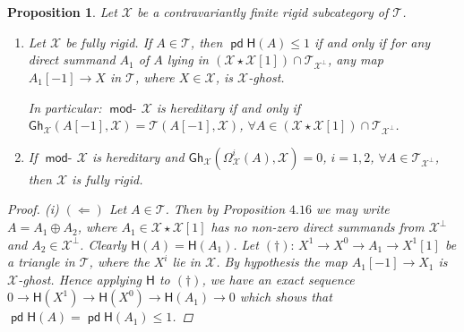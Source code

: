 \documentclass[oneside, a4paper,reqno]{amsart}
\numberwithin{equation}{section}
\newtheorem{prop}[thm]{Proposition}
\theoremstyle{definition}
\begin{document}
\begin{prop} Let ${\mathcal X}$ be a contravariantly finite rigid subcategory of ${\mathcal T}$. 
\begin{enumerate}
\item Let ${\mathcal X}$ be fully rigid.  If $A \in {\mathcal T}$, then $\operatorname{\mathsf{pd}} \mathsf{H}(A) \leq 1$ if and only if for any direct summand $A_{1}$ of $A$ lying in $({\mathcal X}\star{\mathcal X}[1]) \cap {\mathcal T}_{{\mathcal X}^{\bot}}$, any map $A_{1}[-1] {\longrightarrow} X$ in ${\mathcal T}$, where $X \in {\mathcal X}$, is ${\mathcal X}$-ghost. 

In particular:  $\operatorname*{\mathsf{mod}-\!}{\mathcal X}$ is hereditary if and only if $\mathsf{Gh}_{\mathcal X}(A[-1],{\mathcal X}) = {\mathcal T}(A[-1],{\mathcal X})$, $\forall A \in ({\mathcal X}\star{\mathcal X}[1]) \cap {\mathcal T}_{{\mathcal X}^{\bot}}$. 
\item If $\operatorname*{\mathsf{mod}-\!}{\mathcal X}$ is hereditary  and $\mathsf{Gh}_{\mathcal X}(\Omega^{i}_{\mathcal X}(A),{\mathcal X}) = 0$, $i = 1,2$,  $ \forall A \in {\mathcal T}_{{\mathcal X}^{\bot}}$, then ${\mathcal X}$ is fully rigid. 
\end{enumerate} 
\begin{proof} (i) $(\Longleftarrow)$ Let $A\in {\mathcal T}$. Then by Proposition $4.16$ we may write $A = A_{1} \oplus A_{2}$, where $A_{1} \in {\mathcal X}\star{\mathcal X}[1]$ has no non-zero direct summands from ${\mathcal X}^{\bot}$ and $A_{2} \in {\mathcal X}^{\bot}$. Clearly $\mathsf{H}(A) = \mathsf{H}(A_{1})$. Let $(\dag): \, X^{1} {\longrightarrow} X^{0} {\longrightarrow} A_{1} {\longrightarrow} X^{1}[1]$ be a triangle in ${\mathcal T}$, where the $X^{i}$ lie in ${\mathcal X}$. By hypothesis the map $A_{1}[-1]{\longrightarrow} X_{1}$ is ${\mathcal X}$-ghost. Hence applying $\mathsf{H}$ to $(\dag)$, we have an exact sequence $0{\longrightarrow} \mathsf{H}(X^{1}) {\longrightarrow} \mathsf{H}(X^{0}) {\longrightarrow} \mathsf{H}(A_{1}) {\longrightarrow} 0$ which shows that $\operatorname{\mathsf{pd}}\mathsf{H}(A)  = \operatorname{\mathsf{pd}}\mathsf{H}(A_{1}) \leq 1$.


\end{proof}
\end{prop}
\end{document}
